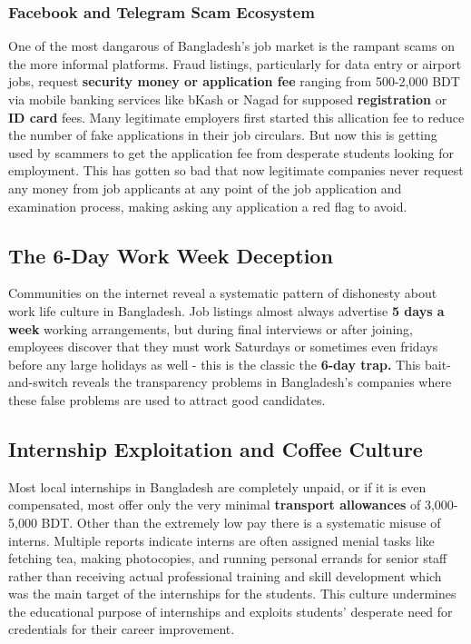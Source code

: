 \documentclass[a4paper, 14pt, openany]{extreport}
\begin{document}
	\subsubsection{Facebook and Telegram Scam Ecosystem}
	
	One of the most dangarous of Bangladesh's job market is the rampant scams on the more informal platforms. Fraud listings, particularly for data entry or airport jobs, request \textbf{security money or application fee} ranging from 500-2,000 BDT via mobile banking services like bKash or Nagad for supposed \textbf{registration} or \textbf{ID card} fees. Many legitimate employers first started this allication fee to reduce the number of fake applications in their job circulars. But now this is getting used by scammers to get the application fee from desperate students looking for employment. This has gotten so bad that now legitimate companies never request any money from job applicants at any point of the job application and examination process, making asking any application a red flag to avoid.
	
	\subsection{The 6-Day Work Week Deception}
	
	Communities on the internet reveal a systematic pattern of dishonesty about work life culture\cite{reddit_job_frustration} in Bangladesh. Job listings almost always advertise \textbf{5 days a week} working arrangements, but during final interviews or after joining, employees discover that they must work Saturdays or sometimes even fridays before any large holidays as well - this is the classic the \textbf{6-day trap.} This bait-and-switch reveals the transparency problems in Bangladesh's companies where these false problems are used to attract good candidates.
	
	\subsection{Internship Exploitation and \textbf{Coffee Culture}}
	
	Most local internships in Bangladesh are completely unpaid, or if it is even compensated, most offer only the very minimal \textbf{transport allowances} of 3,000-5,000 BDT. Other than the extremely low pay there is a systematic misuse of interns. Multiple reports indicate interns are often assigned menial tasks like fetching tea, making photocopies, and running personal errands for senior staff rather than receiving actual professional training and skill development which was the main target of the internships for the students. This culture undermines the educational purpose of internships and exploits students' desperate need for credentials for their career improvement.
	
\end{document}
